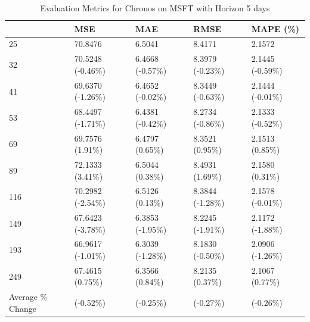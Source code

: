 \begin{table}
\caption{Evaluation Metrics for Chronos on MSFT with Horizon 5 days}
\label{tab:chronos_base_MSFT_h5_metrics}
\begin{tabular}{lllll}
\toprule
 & MSE & MAE & RMSE & MAPE (\%) \\
\midrule
25 & 70.8476 & 6.5041 & 8.4171 & 2.1572 \\
32 & 70.5248 (-0.46\%) & 6.4668 (-0.57\%) & 8.3979 (-0.23\%) & 2.1445 (-0.59\%) \\
41 & 69.6370 (-1.26\%) & 6.4652 (-0.02\%) & 8.3449 (-0.63\%) & 2.1444 (-0.01\%) \\
53 & 68.4497 (-1.71\%) & 6.4381 (-0.42\%) & 8.2734 (-0.86\%) & 2.1333 (-0.52\%) \\
69 & 69.7576 (1.91\%) & 6.4797 (0.65\%) & 8.3521 (0.95\%) & 2.1513 (0.85\%) \\
89 & 72.1333 (3.41\%) & 6.5044 (0.38\%) & 8.4931 (1.69\%) & 2.1580 (0.31\%) \\
116 & 70.2982 (-2.54\%) & 6.5126 (0.13\%) & 8.3844 (-1.28\%) & 2.1578 (-0.01\%) \\
149 & 67.6423 (-3.78\%) & 6.3853 (-1.95\%) & 8.2245 (-1.91\%) & 2.1172 (-1.88\%) \\
193 & 66.9617 (-1.01\%) & 6.3039 (-1.28\%) & 8.1830 (-0.50\%) & 2.0906 (-1.26\%) \\
249 & 67.4615 (0.75\%) & 6.3566 (0.84\%) & 8.2135 (0.37\%) & 2.1067 (0.77\%) \\
Average \% Change & (-0.52\%) & (-0.25\%) & (-0.27\%) & (-0.26\%) \\
\bottomrule
\end{tabular}
\end{table}
